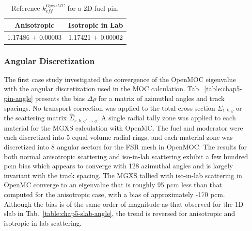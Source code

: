 \begin{table}[h!]
  \centering
  \caption[Reference $k^{OpenMC}_{eff}$ for a 2D fuel pin]{Reference $k^{OpenMC}_{eff}$ for a 2D fuel pin.}
  \label{table:chap5-pin-reference} 
  \vspace{6pt}
  \begin{tabular}{c c}
  \toprule
  \rowcolor{lightgray}
  {\cellcolor{carolinablue} {\bf Anisotropic}} &
  {\cellcolor{lightgreen} {\bf Isotropic in Lab}} \\
  \midrule
  1.17486 $\pm$ 0.00003 & 1.17421 $\pm$ 0.00002 \\
  \bottomrule
\end{tabular}
\end{table}

\subsubsection{Angular Discretization}
\label{subsubsec:chap5-pin-angle}

The first case study investigated the convergence of the OpenMOC eigenvalue with the angular discretization used in the \ac{MOC} calculation. Tab.~\ref{table:chap5-pin-angle} presents the bias $\Delta\rho$ for a matrix of azimuthal angles and track spacings. No transport correction was applied to the total cross section $\hat{\Sigma}_{t,k,g}$ or the scattering matrix $\hat{\Sigma}_{s,k,g'\rightarrow g}$. A single radial tally zone was applied to each material for the \ac{MGXS} calculation with OpenMC. The fuel and moderator were each discretized into 5 equal volume radial rings, and each material zone was discretized into 8 angular sectors for the \ac{FSR} mesh in OpenMOC. The results for both normal anisotropic scattering and iso-in-lab scattering exhibit a few hundred \ac{pcm} bias which appears to converge with 128 azimuthal angles and is largely invariant with the track spacing. The \ac{MGXS} tallied with iso-in-lab scattering in OpenMC converge to an eigenvalue that is roughly 95 \ac{pcm} less than that computed for the anisotropic case, with a bias of approximately -170 pcm. Although the bias is of the same order of magnitude as that observed for the 1D slab in Tab.~\ref{table:chap5-slab-angle}, the trend is reversed for anisotropic and isotropic in lab scattering.

